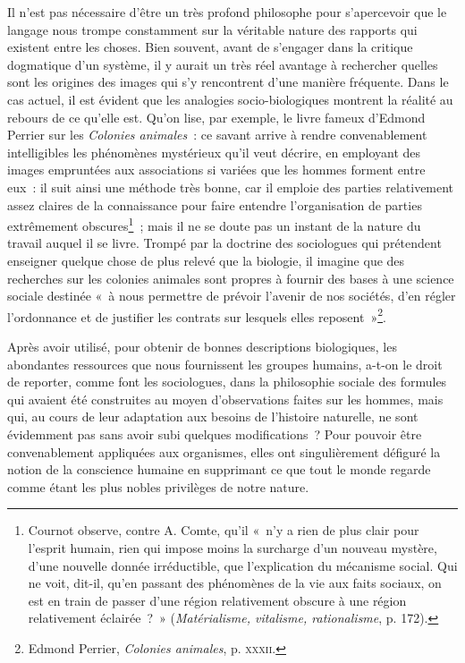 \documentclass[french,twoside]{book} %
\begin{document}
Il n’est pas nécessaire d’être un très profond philosophe pour s’apercevoir que le langage nous trompe constamment sur la véritable nature des rapports qui existent entre les choses. Bien souvent, avant de s’engager dans la critique dogmatique d’un système, il y aurait un très réel avantage à rechercher quelles sont les origines des images qui s’y rencontrent d’une manière fréquente. Dans le cas actuel, il est évident que les analogies socio-biologiques montrent la réalité au rebours de ce qu’elle est. Qu’on lise, par exemple, le livre fameux d’Edmond Perrier sur les \emph{Colonies animales} : ce savant arrive à rendre convenablement intelligibles les phénomènes mystérieux qu’il veut décrire, en employant des images empruntées aux associations si variées que les hommes  forment entre eux : il suit ainsi une méthode très bonne, car il emploie des parties relativement assez claires de la connaissance pour faire entendre l’organisation de parties extrêmement obscures\footnote{ \noindent Cournot observe, contre A. Comte, qu’il « n’y a rien de plus clair pour l’esprit humain, rien qui impose moins la surcharge d’un nouveau mystère, d’une nouvelle donnée irréductible, que l’explication du mécanisme social. Qui ne voit, dit-il, qu’en passant des phénomènes de la vie aux faits sociaux, on est en train de passer d’une région relativement obscure à une région relativement éclairée ? » (\emph{Matérialisme, vitalisme, rationalisme}, p. 172).
 } ; mais il ne se doute pas un instant de la nature du travail auquel il se livre. Trompé par la doctrine des sociologues qui prétendent enseigner quelque chose de plus relevé que la biologie, il imagine que des recherches sur les colonies animales sont propres à fournir des bases à une science sociale destinée « à nous permettre de prévoir l’avenir de nos sociétés, d’en régler l’ordonnance et de justifier les contrats sur lesquels elles reposent »\footnote{ \noindent Edmond Perrier, \emph{Colonies animales}, p. {\scshape xxxii}.
 }.\par
Après avoir utilisé, pour obtenir de bonnes descriptions biologiques, les abondantes ressources que nous fournissent les groupes humains, a-t-on le droit de reporter, comme font les sociologues, dans la philosophie sociale des formules qui avaient été construites au moyen d’observations faites sur les hommes, mais qui, au cours de leur adaptation aux besoins de l’histoire naturelle, ne sont évidemment pas sans avoir subi quelques modifications ? Pour pouvoir être convenablement appliquées aux  organismes, elles ont singulièrement défiguré la notion de la conscience humaine en supprimant ce que tout le monde regarde comme étant les plus nobles privilèges de notre nature.\par
\end{document}
